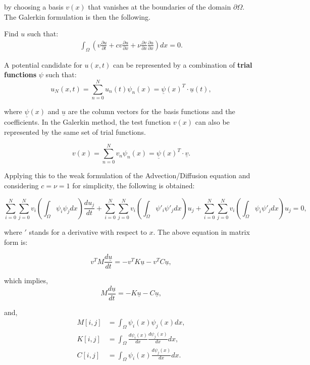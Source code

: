 \documentclass[
  a4paper,
  10pt]{article}
\begin{document}
by choosing a basis \(v(x)\) that vanishes at the boundaries of the
domain \(\partial\Omega\). The Galerkin formulation is then the
following.

Find \(u\) such that: \begin{align}
\int_{\Omega} (v\frac{\partial u}{\partial t} + cv\frac{\partial u}{\partial x} + \nu\frac{\partial v}{\partial x}\frac{\partial u}{\partial x})dx = 0.
\end{align}

A potential candidate for \(u(x,t)\) can be represented by a combination
of \textbf{trial functions} \(\psi\) such that: \begin{equation}
    u_N(x,t) = \sum_{n=0}^N u_n(t) \psi_n(x) = \underline{\psi}(x)^T \cdot \underline{u}(t),
\end{equation}

where \(\underline{\psi}(x)\) and \(\underline{u}\) are the column vectors for the basis functions and the coefficients. In the Galerkin method, the test function \(v(x)\) can also be
represented by the same set of trial functions.

\begin{equation}
    v(x) = \sum_{n=0}^N v_n \psi_n(x) = \underline{\psi}(x)^T \cdot \underline{v}.
\end{equation}

Applying this to the weak formulation of the Advection/Diffusion
equation and considering \(c=\nu=1\) for simplicity, the following is
obtained:

\begin{equation}
 \sum_{i=0}^{N}\sum_{j=0}^{N} v_i( \int_{\Omega}\psi_{i}\psi_{j}dx)\frac{du_j}{dt}+\sum_{i=0}^{N}\sum_{j=0}^{N} v_i( \int_{\Omega}\psi'_{i}\psi'_{j}dx)u_j+\sum_{i=0}^{N}\sum_{j=0}^{N} v_i( \int_{\Omega}\psi_{i}\psi'_{j}dx)u_j=0,
\end{equation}

where $'$ stands for a derivative with respect to $x$. The above equation in matrix form is:

\begin{equation}
v^{T}M\frac{d\underline{u}}{dt}=-v^{T}K\underline{u}-v^{T}C\underline{u},
\end{equation}

which implies, \begin{equation}
M\frac{d\underline{u}}{dt}=-K\underline{u}-C\underline{u},
\end{equation}

and, \begin{align}
M[i,j]&=\int_{\Omega}\psi_i(x)\psi_j(x)dx, \\
K[i,j]&=\int_{\Omega}\frac{d\psi_i(x)}{dx}\frac{d\psi_j(x)}{dx}dx, \\
C[i,j] &= \int_{\Omega}\psi_i(x)\frac{d\psi_j(x)}{dx}dx. \\
\end{align}
\end{document}

